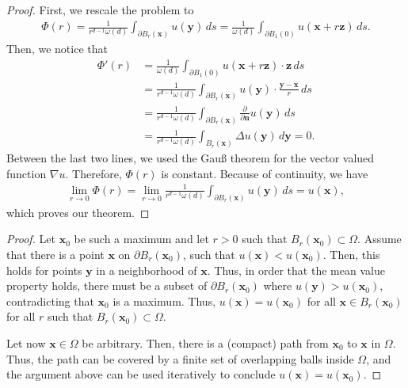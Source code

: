 \begin{proof}
  First, we rescale the problem to
  \begin{gather*}
    \Phi(r) = \frac1{r^{d-1}\omega(d)}
    \int_{\partial B_r(\mathbf x)} u(\mathbf y) \,ds
    = \frac1{\omega(d)} \int_{\partial B_1(0)} u(\mathbf x+r\mathbf z) \,ds.
  \end{gather*}
  Then, we notice that
  \begin{align*}
    \Phi'(r)
    &= \frac1{\omega(d)} \int_{\partial B_1(0)} u(\mathbf x+r\mathbf z)\cdot \mathbf z \,ds\\
    &= \frac1{r^{d-1}\omega(d)} \int_{\partial B_r(\mathbf x)}
    u(\mathbf y)\cdot\frac{\mathbf y-\mathbf x}{r} \,ds\\
    &= \frac1{r^{d-1}\omega(d)} \int_{\partial B_r(\mathbf x)}
    \frac{\partial}{\partial \mathbf n} u(\mathbf y) \,ds\\
    &= \frac1{r^{d-1}\omega(d)} \int_{B_r(\mathbf x)}
    \Delta u(\mathbf y)\,d\mathbf y = 0.
  \end{align*}
  Between the last two lines, we used the Gauß theorem for the vector
  valued function $\nabla u$. Therefore, $\Phi(r)$ is
  constant. Because of continuity, we have
  \begin{gather*}
    \lim_{r\to 0} \Phi(r) =
    \lim_{r\to 0}\frac1{r^{d-1}\omega(d)} \int_{\partial B_r(\mathbf x)} u(\mathbf y)
    \,ds
    = u(\mathbf x),
  \end{gather*}
  which proves our theorem.
\end{proof}



\begin{proof}
  Let $\mathbf x_0$ be such a maximum and let $r>0$ such that
  $B_r(\mathbf x_0) \subset \Omega$. Assume that there is a point
  $\mathbf x$ on $\partial B_r(\mathbf x_0)$, such that $u(\mathbf x)
  < u(\mathbf x_0)$. Then, this holds for points $\mathbf y$ in a
  neighborhood of $\mathbf x$. Thus, in order that the mean value
  property holds, there must be a subset of $\partial B_r(\mathbf
  x_0)$ where $u(\mathbf y) > u(\mathbf x_0)$, contradicting that
  $\mathbf x_0$ is a maximum. Thus, $u(\mathbf x) = u(\mathbf x_0)$
  for all $\mathbf x \in B_r(\mathbf x_0)$ for all $r$ such that
  $B_r(\mathbf x_0) \subset \Omega$.

  Let now $\mathbf x\in \Omega$ be arbitrary. Then, there is a
  (compact) path from $\mathbf x_0$ to $\mathbf x$ in $\Omega$. Thus,
  the path can be covered by a finite set of overlapping balls inside
  $\Omega$, and the argument above can be used iteratively to conclude
  $u(\mathbf x) = u(\mathbf x_0)$.
\end{proof}

